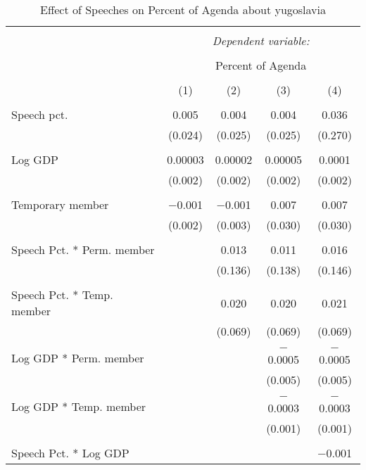 
\begin{table}[!htbp] \centering 
  \caption{Effect of Speeches on Percent of Agenda about  yugoslavia} 
  \label{} 
\begin{tabular}{@{\extracolsep{5pt}}lcccc} 
\\[-1.8ex]\hline 
\hline \\[-1.8ex] 
 & \multicolumn{4}{c}{\textit{Dependent variable:}} \\ 
\cline{2-5} 
\\[-1.8ex] & \multicolumn{4}{c}{Percent of Agenda} \\ 
\\[-1.8ex] & (1) & (2) & (3) & (4)\\ 
\hline \\[-1.8ex] 
 Speech pct. & 0.005 & 0.004 & 0.004 & 0.036 \\ 
  & (0.024) & (0.025) & (0.025) & (0.270) \\ 
  & & & & \\ 
 Log GDP & 0.00003 & 0.00002 & 0.00005 & 0.0001 \\ 
  & (0.002) & (0.002) & (0.002) & (0.002) \\ 
  & & & & \\ 
 Temporary member & $-$0.001 & $-$0.001 & 0.007 & 0.007 \\ 
  & (0.002) & (0.003) & (0.030) & (0.030) \\ 
  & & & & \\ 
 Speech Pct. * Perm. member &  & 0.013 & 0.011 & 0.016 \\ 
  &  & (0.136) & (0.138) & (0.146) \\ 
  & & & & \\ 
 Speech Pct. * Temp. member &  & 0.020 & 0.020 & 0.021 \\ 
  &  & (0.069) & (0.069) & (0.069) \\ 
  & & & & \\ 
 Log GDP * Perm. member &  &  & $-$0.0005 & $-$0.0005 \\ 
  &  &  & (0.005) & (0.005) \\ 
  & & & & \\ 
 Log GDP * Temp. member &  &  & $-$0.0003 & $-$0.0003 \\ 
  &  &  & (0.001) & (0.001) \\ 
  & & & & \\ 
 Speech Pct. * Log GDP &  &  &  & $-$0.001 \\ 

\end{tabular}
\end{table}
